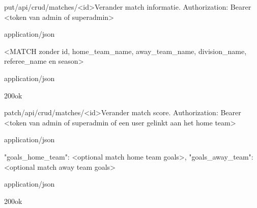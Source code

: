\documentclass[10pt]{article}
\begin{document}
\begin{apiRoute}{put}{/api/crud/matches/<id>}{Verander match informatie.}
 Authorization: Bearer <token van admin of superadmin>
	\begin{routeParameter}
	\end{routeParameter}

	\begin{routeRequest}{application/json}
		\begin{routeRequestBody}
<MATCH zonder id, home_team_name, away_team_name, division_name, referee_name en season>
		\end{routeRequestBody}
	\end{routeRequest}

	\begin{routeResponse}{application/json}
		\begin{routeResponseItem}{200}{ok}
			\begin{routeResponseItemBody}
			\end{routeResponseItemBody}
		\end{routeResponseItem}
	\end{routeResponse}
\end{apiRoute}

\begin{apiRoute}{patch}{/api/crud/matches/<id>}{Verander match score.}
 Authorization: Bearer <token van admin of superadmin of een user gelinkt aan het home team>
	\begin{routeParameter}
		\routeParamItem{id}{match id}
	\end{routeParameter}

	\begin{routeRequest}{application/json}
		\begin{routeRequestBody}
{
	"goals_home_team": <optional match home team goals>,
	"goals_away_team": <optional match away team goals>
}
		\end{routeRequestBody}
	\end{routeRequest}

	\begin{routeResponse}{application/json}
		\begin{routeResponseItem}{200}{ok}
			\begin{routeResponseItemBody}
			\end{routeResponseItemBody}
		\end{routeResponseItem}
	\end{routeResponse}
\end{apiRoute}
\end{document}
